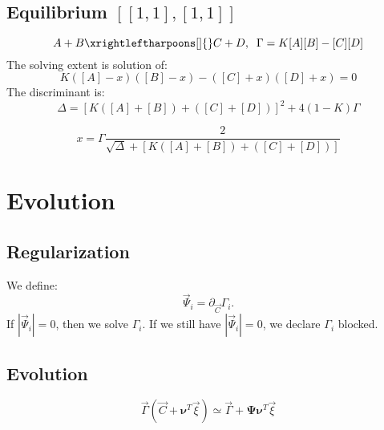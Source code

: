 \documentclass[aps,12pt]{revtex4}
\begin{document}
\subsection{Equilibrium $[ [1,1], [1,1]]$}
\begin{equation}
	A+B \xrightleftharpoons[]{} C+D, \;\; \Gamma = K[A][B] - [C][D]
\end{equation}
The solving extent is solution of:
\begin{equation}
	K([A]-x)([B]-x) - ([C]+x)([D]+x)= 0
\end{equation}
The discriminant is:
\begin{equation}
	\Delta = \left[K([A]+[B])+([C]+[D])\right]^2 + 4 (1-K) \Gamma
\end{equation}

\begin{equation}
x = \Gamma \dfrac{2}{\sqrt{\Delta}+\left[K([A]+[B])+([C]+[D])\right]}
\end{equation}

\section{Evolution}

\subsection{Regularization}
We define:
\begin{equation}
\vec{\Psi}_i = \partial_{\vec{C}} \Gamma_i.
\end{equation}
If $|\vec{\Psi}_i|=0$, then we solve $\Gamma_i$. If we still have $|\vec{\Psi}_i|=0$, we declare $\Gamma_i$ blocked.

\subsection{Evolution}

\begin{equation}
	\vec{\Gamma}(\vec{C}+\bm{\nu}^T \vec{\xi}) \simeq \vec{\Gamma} + \bm{\Psi} \bm{\nu}^T \vec{\xi}
\end{equation}	
	




 


 
\end{document}
